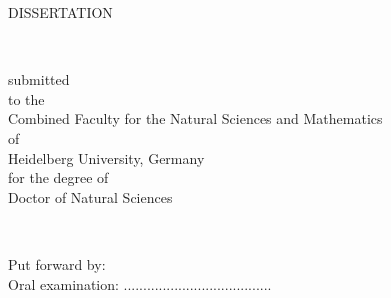 \begin{titlepage}
    \linespread{1.25}
    \vspace*{5cm}
    \makeatletter
    \begin{center}
      \begin{Huge}
        DISSERTATION
      \end{Huge}\\
      \begin{Large}
        submitted\\
        to the\\
        Combined Faculty for the Natural Sciences and Mathematics\\
        of\\
        Heidelberg University, Germany\\
        for the degree of\\
        \vspace*{0.3cm}
        Doctor of Natural Sciences
      \end{Large}\\
      \vfill
      \begin{Large}
        Put forward by:\\
        \@author
        Oral examination: ......................................\\
      \end{Large}
    \end{center}
    \makeatother
  \end{titlepage}
  \newpage
  \null
  \thispagestyle{empty}
  \newpage